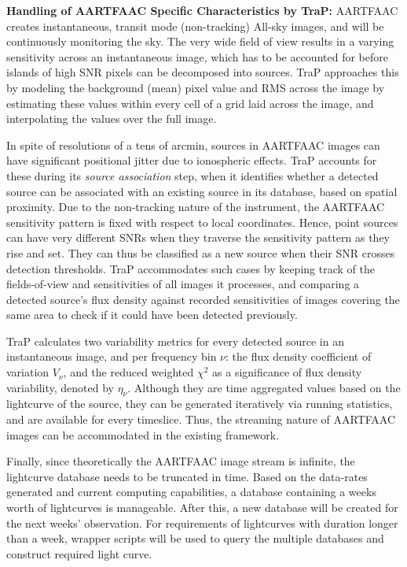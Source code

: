 \documentclass{ws-jai}
\begin{document}
\noindent  \textbf  {Handling of  AARTFAAC  Specific  Characteristics by  TraP:}
AARTFAAC creates instantaneous, transit  mode (non-tracking) All-sky images, and
will be continuously monitoring the sky. The  very wide field of view results in
a varying sensitivity  across an instantaneous image, which has  to be accounted
for before  islands of  high SNR  pixels can be  decomposed into  sources.  TraP
approaches this by modeling the background (mean) pixel value and RMS across the
image by  estimating these values  within every cell of  a grid laid  across the
image, and interpolating the values over the full image.

In spite of resolutions of a tens of arcmin, sources in AARTFAAC images can have
significant positional  jitter due  to ionospheric  effects.  TraP  accounts for
these during its \textit{source association}  step, when it identifies whether a
detected source can be associated with an existing source in its database, based
on spatial  proximity.  Due to  the non-tracking  nature of the  instrument, the
AARTFAAC sensitivity pattern is fixed  with respect to local coordinates. Hence,
point sources  can have very different  SNRs when they traverse  the sensitivity
pattern as they rise and set.  They can  thus be classified as a new source when
their SNR crosses detection thresholds.  TraP accommodates such cases by keeping
track of  the fields-of-view and sensitivities  of all images it  processes, and
comparing a  detected source's  flux density  against recorded  sensitivities of
images  covering  the  same  area  to  check if  it  could  have  been  detected
previously.

TraP  calculates  two  variability  metrics  for every  detected  source  in  an
instantaneous image, and  per frequency bin $\nu$: the  flux density coefficient
of variation $V_{\nu}$,  and the reduced weighted $\chi^2$ as  a significance of
flux  density  variability, denoted  by  $\eta_{\nu}$.  Although they  are  time
aggregated values based  on the lightcurve of the source,  they can be generated
iteratively  via running  statistics,  and are  available  for every  timeslice.
Thus,  the streaming  nature  of  AARTFAAC images  can  be  accommodated in  the
existing framework.

Finally,  since  theoretically  the  AARTFAAC  image  stream  is  infinite,  the
lightcurve database  needs to  be truncated  in time.   Based on  the data-rates
generated  and current  computing capabilities,  a database  containing a  weeks
worth of lightcurves is manageable.  After  this, a new database will be created
for the next  weeks' observation. For requirements of  lightcurves with duration
longer than a week, wrapper scripts will be used to query the multiple databases
and construct required light curve.
\end{document}
